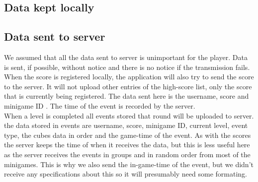 

\subsection{Data kept locally}
\subsection{Data sent to server}
We assumed that all the data sent to server is unimportant for the player. Data is sent, if possible, without notice and there is no notice if the transmission fails.
When the score is registered locally, the application will also try to send the score to the server. It will not upload other entries of the high-score list, only the score that is currently being registered. The data sent here is the username, score and minigame ID . The time of the event is recorded by the server. \\
When a level is completed all events stored that round will be uploaded to server. the data stored in events are username, score, minigame ID, current level, event type, the cubes data in order and the game-time of the event. As with the scores the server keeps the time of when it receives the data, but this is less useful here as the server receives the events in groups and in random order from most of the minigames. This is why we also send the in-game-time of the event, but we didn't receive any specifications about this so it will presumably need some formating. 